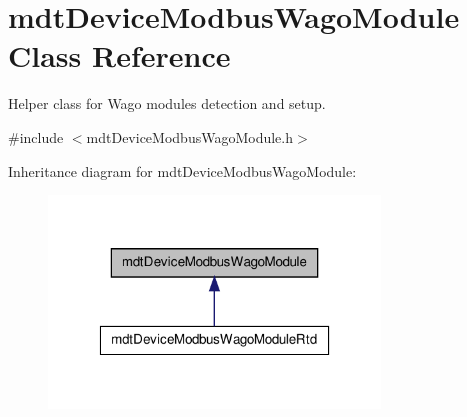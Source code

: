 \hypertarget{classmdt_device_modbus_wago_module}{
\section{mdtDeviceModbusWagoModule Class Reference}
\label{classmdt_device_modbus_wago_module}
}


Helper class for Wago modules detection and setup.  




{\ttfamily \#include $<$mdtDeviceModbusWagoModule.h$>$}



Inheritance diagram for mdtDeviceModbusWagoModule:
\nopagebreak
\begin{figure}[H]
\begin{center}
\leavevmode
\includegraphics[width=250pt]{classmdt_device_modbus_wago_module__inherit__graph}
\end{center}
\end{figure}


